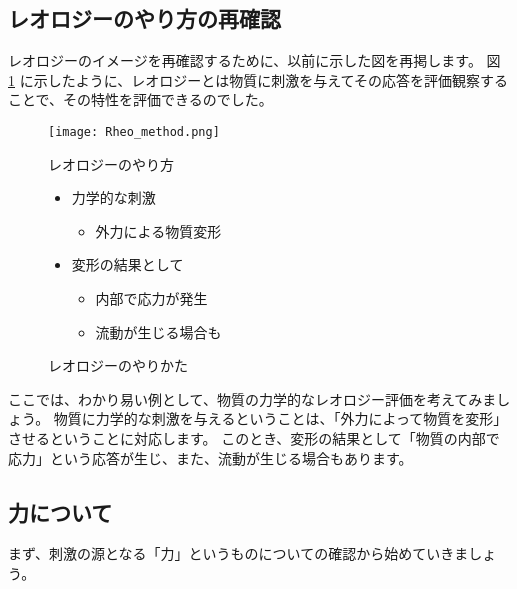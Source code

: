 \documentclass[uplatex,dvipdfmx,a4paper,11pt]{jsreport}
\begin{document}
\subsection{レオロジーのやり方の再確認}
レオロジーのイメージを再確認するために、以前に示した図を再掲します。
図 \ref{yarikata2} に示したように、レオロジーとは物質に刺激を与えてその応答を評価観察することで、その特性を評価できるのでした。
\begin{figure}[htb]
	\begin{center}
		\begin{minipage}{.45\textwidth}
			\texttt{[image: Rheo\_method.png]}
		\end{minipage}
		\begin{minipage}{.45\textwidth}
			\large
			\begin{itembox}[l]{レオロジーのやり方}
				\begin{itemize}
					\item 力学的な刺激
					\begin{itemize}
						\item 外力による物質変形
					\end{itemize}
					\item 変形の結果として
					\begin{itemize}
						\item 内部で応力が発生
						\item 流動が生じる場合も
					\end{itemize}
				\end{itemize}
			\end{itembox}
		\end{minipage}
	\caption{レオロジーのやりかた}
	\label{yarikata2}
    \end{center}
\end{figure}

ここでは、わかり易い例として、物質の力学的なレオロジー評価を考えてみましょう。
物質に力学的な刺激を与えるということは、「外力によって物質を変形」させるということに対応します。
このとき、変形の結果として「物質の内部で応力」という応答が生じ、また、流動が生じる場合もあります。

\subsection{力について}
まず、刺激の源となる「力」というものについての確認から始めていきましょう。
\end{document}
